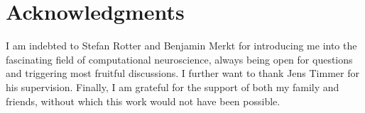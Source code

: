 

\begingroup
\let\clearpage\relax
\let\cleardoublepage\relax
\let\cleardoublepage\relax
\chapter*{Acknowledgments}

I am indebted to Stefan Rotter and Benjamin Merkt for introducing 
me into the fascinating field of computational neuroscience, always
being open for questions and triggering most fruitful discussions. I further want
to thank Jens Timmer for his supervision. Finally, I am grateful for the support 
of both my family and friends, without which this work would not have been possible.


\endgroup



